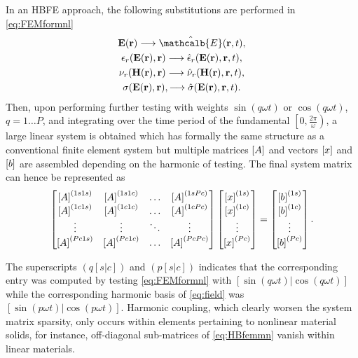 In an HBFE approach, the following substitutions are performed in \eqref{eq:FEMformnl} 
\begin{gather*}
 \mathbf{E}(\mathbf{r}) \longrightarrow \hat{\mathcalb{E}}(\mathbf{r}, t), \\
 \epsilon_r(\mathbf{E}(\mathbf{r}),\mathbf{r}) \longrightarrow \hat{\epsilon}_r(\mathbf{E}(\mathbf{r}),\mathbf{r}, t),\\
\nu_r(\mathbf{H}(\mathbf{r}),\mathbf{r}) \longrightarrow \hat{\nu}_r(\mathbf{H}(\mathbf{r}),\mathbf{r}, t),\\
\sigma(\mathbf{E}(\mathbf{r}),\mathbf{r}), \longrightarrow \hat{\sigma}(\mathbf{E}(\mathbf{r}),\mathbf{r}, t).
\end{gather*}
Then, upon performing further testing with weights $\sin(q \omega t)$ or $\cos(q \omega t)$, $q = 1 \dots P$, and integrating over the time period of the fundamental $\left [ 0,\frac{2\pi}{\omega} \right )$,  a large linear system is obtained which has formally the same structure as a conventional finite element system but multiple matrices $\left[A\right]$ and vectors $ \left[{{x}}\right]$ and $\left[{{b}}\right]$ are assembled depending on the harmonic of testing. The final system matrix can hence be represented as
%
\begin{equation}\label{eq:HBfemmn}
\begin{bmatrix}
\left[A\right]^{(1s1s)} & \left[A\right]^{(1s1c)} & \ldots &  \left[A\right]^{(1sPc)} \\
\left[A\right]^{(1c1s)} & \left[A\right]^{(1c1c)} & \ldots &  \left[A\right]^{(1cPc)} \\
\vdots & \vdots & \ddots & \vdots \\
\left[A\right]^{(Pc1s)} & \left[A\right]^{(Pc1c)} & \ldots &  \left[A\right]^{(PcPc)}
\end{bmatrix}
\begin{bmatrix}
\left[{{x}}\right]^{(1s)} \\
\left[{{x}}\right]^{(1c)} \\
\vdots \\
\left[{{x}}\right]^{(Pc)}
\end{bmatrix}
=
\begin{bmatrix}
\left[{{b}}\right]^{(1s)}\\
\left[{{b}}\right]^{(1c)}\\
\vdots\\
\left[{{b}}\right]^{(Pc)}
\end{bmatrix}.
\end{equation}

\noindent The superscripts $(q[s|c])$ and $(p[s|c])$ indicates that the corresponding
entry was computed by testing \eqref{eq:FEMformnl} with $[\sin(q \omega t) | \cos(q \omega t)]$ while the corresponding harmonic basis of \eqref{eq:field}
was $[\sin(p \omega t) | \cos(p \omega t)]$. Harmonic coupling, which clearly worsen the system matrix sparsity, only occurs within elements pertaining to nonlinear material solids, for instance, off-diagonal sub-matrices of \eqref{eq:HBfemmn} vanish within linear materials.

